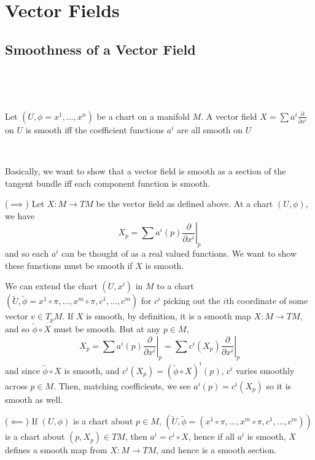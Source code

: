 \documentclass{article}
\begin{document}
\section{Vector Fields}

\subsection{Smoothness of a Vector Field}
\

\begin{lemma}
  \

  Let $(U, \phi = x^1, \dots, x^n)$ be a chart on a manifold $M$. A vector field $X = \sum a^i \frac{\partial}{\partial x^i}$ on $U$ is smooth iff the coefficient functions $a^i$ are all smooth on $U$
\end{lemma}

\begin{customproof}
  \

  Basically, we want to show that a vector field is smooth as a section of the tangent bundle iff each component function is smooth.

  ($\implies$) Let $X: M \to TM$ be the vector field as defined above. At a chart $(U, \phi)$, we have $$X_p = \sum a^i(p)\left.\frac{\partial}{\partial x^i} \right\vert_p$$and so each $a^i$ can be thought of as a real valued functions. We want to show these functions must be smooth if $X$ is smooth.

  We can extend the chart $(U, x^i)$ in $M$ to a chart $(\tilde{U}, \tilde{\phi} = x^1 \circ \pi, \dots, x^m \circ \pi, c^1, \dots, c^m)$ for $c^i$ picking out the $i$th coordinate of some vector $v \in T_pM$. If $X$ is smooth, by definition, it is a smooth map $X: M \to TM$, and so $\tilde{\phi} \circ X$ must be smooth. But at any $p \in M$, $$X_p = \sum a^i(p) \left.\frac{\partial}{\partial x^i}\right\vert_p = \sum c^i(X_p) \left.\frac{\partial}{\partial x^i}\right\vert_p $$and since $\tilde{\phi} \circ X$ is smooth, and $c^i(X_p) = (\tilde{\phi} \circ X)^i(p)$, $c^i$ varies smoothly across $p \in M$. Then, matching coefficients, we see $a^i(p) = c^i(X_p)$ so it is smooth as well.

  ($\impliedby$) If $(U, \phi)$ is a chart about $p\in M$, $(\tilde{U}, \tilde{\phi} = (x^1 \circ \pi, \dots, x^m \circ \pi, c^1, \dots, c^m))$ is a chart about $(p, X_p) \in TM$, then $a^i = c^i \circ X$, hence if all $a^i$ is smooth, $X$ defines a smooth map from $X: M \to TM$, and hence is a smooth section.
\end{customproof}
\end{document}
